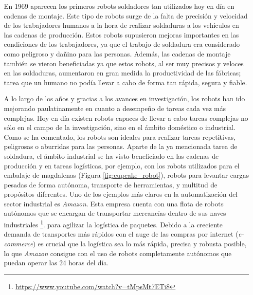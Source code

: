 En 1969 aparecen los primeros robots soldadores tan utilizados hoy en día en cadenas de montaje. Este tipo de robots surge de la falta de precisión y velocidad de los trabajadores humanos a la hora de realizar soldaduras a los vehículos en las cadenas de producción. Estos robots supusieron mejoras importantes en las condiciones de los trabajadores, ya que el trabajo de soldadura era considerado como peligroso y dañino para las personas. Además, las cadenas de montaje también se vieron beneficiadas ya que estos robots, al ser muy precisos y veloces en las soldaduras, aumentaron en gran medida la productividad de las fábricas; tarea que un humano no podía llevar a cabo de forma tan rápida, segura y fiable.

A lo largo de los años y gracias a los avances en investigación, los robots han ido mejorando paulatinamente en cuanto a desempeño de tareas cada vez más complejas. Hoy en día existen robots capaces de llevar a cabo tareas complejas no sólo en el campo de la investigación, sino en el ámbito doméstico o industrial. Como se ha comentado, los robots son ideales para realizar tareas repetitivas, peligrosas o aburridas para las personas. Aparte de la ya mencionada tarea de soldadura, el ámbito industrial se ha visto beneficiado en las cadenas de producción y en tareas logísticas, por ejemplo, con los robots utilizados para el embalaje de magdalenas (Figura \ref{fig:cupcake_robot}), robots para levantar cargas pesadas de forma autónoma, transporte de herramientas, y multitud de propósitos diferentes. Uno de los ejemplos más claros en la automatización del sector industrial es \textit{Amazon}. Esta empresa cuenta con una flota de robots autónomos que se encargan de transportar mercancías dentro de sus naves industriales \footnote{\url{https://www.youtube.com/watch?v=tMpsMt7ETi8}}. para agilizar la logística de paquetes. Debido a la creciente demanda de transportes más rápidos con el auge de las compras por internet (\textit{e-commerce}) es crucial que la logística sea lo más rápida, precisa y robusta posible, lo que \textit{Amazon} consigue con el uso de robots completamente autónomos que puedan operar las 24 horas del día.

